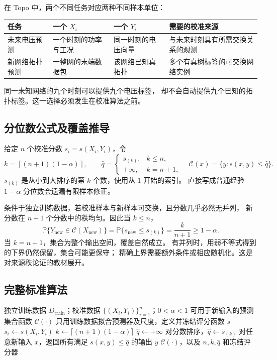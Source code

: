 \documentclass[UTF8,11pt,fontset=fandol,openany,oneside]{ctexbook}
\theoremstyle{definition}
\theoremstyle{remark}
\numberwithin{equation}{chapter}
\begin{document}
在 Topo 中，两个不同任务对应两种不同样本单位：
\begin{center}
\begin{tabularx}{\linewidth}{lXXX}
\toprule
任务 & 一个 $X_i$ & 一个 $Y_i$ & 需要的校准来源\\
\midrule
未来电压预测 & 一个时刻的功率与工况 & 同一时刻的电压向量 & 与未来时刻具有所需交换关系的观测\\
新网络拓扑预测 & 一整网的末端数据包 & 该网络已知真拓扑 & 多个有真树标签的可交换网络实例\\
\bottomrule
\end{tabularx}
\end{center}
同一未知网络的九个时刻可以提供九个电压标签，
却不会自动提供九个已知的拓扑标签。这一选择必须发生在校准算法之前。

\subsection{分位数公式及覆盖推导}

给定 $n$ 个校准分数 $s_i=s(X_i,Y_i)$，令
\begin{equation}
 k=\left\lceil(n+1)(1-\alpha)\right\rceil,\qquad
 \widehat q=
 \begin{cases}
 s_{(k)},& k\le n,\\
 +\infty,& k=n+1,
 \end{cases}
 \quad
 \mathcal C(x)=\{y:s(x,y)\le\widehat q\}.
 \label{eq:textbook-S17-quantile}
\end{equation}
$s_{(k)}$ 是从小到大排序的第 $k$ 个数，使用从 $1$ 开始的索引。
直接写成普通经验 $1-\alpha$ 分位数会遗漏有限样本修正。

条件于独立训练数据，若校准样本与新样本可交换，且分数几乎必然无并列，
新分数在 $n+1$ 个分数中的秩均匀。因此当 $k\le n$，
\[
 \mathbb P\{Y_{\mathrm{new}}\in\mathcal C(X_{\mathrm{new}})\}
 =\mathbb P\{s_{\mathrm{new}}\le s_{(k)}\}
 =\frac{k}{n+1}\ge1-\alpha.
\]
当 $k=n+1$，集合为整个输出空间，覆盖自然成立。
有并列时，用弱不等式得到的下界仍然保留，集合可能更保守；
精确上界需要额外条件或相应随机化。这是对来源秩论证的教材展开。

\subsection{完整标准算法}

\begin{algorithm}[htbp]
\caption{S17：split conformal（原算法的索引与边界显式整理）}
\label{alg:textbook-S17}
\begin{algorithmic}[1]
\Require 独立训练数据 $D_{\mathrm{train}}$；校准数据 $\{(X_i,Y_i)\}_{i=1}^n$；$0<\alpha<1$
\Ensure 可用于新输入的预测集合函数 $\mathcal C(\cdot)$
\State 只用训练数据拟合预测器及尺度，定义并冻结评分函数 $s$
  \State $s_i\gets s(X_i,Y_i)$
\EndFor
\State $k\gets\lceil(n+1)(1-\alpha)\rceil$
  \State $\widehat q\gets+\infty$
\Else
  \State 对分数排序，$\widehat q\gets s_{(k)}$
\EndIf
\State 对任意新输入 $x$，返回所有满足 $s(x,y)\le\widehat q$ 的输出 $y$
\State \Return $\mathcal C(\cdot)$，以及 $n,k,\widehat q$ 和冻结评分器
\end{algorithmic}
\end{algorithm}
\end{document}
